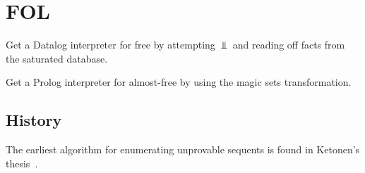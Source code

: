 \chapter{FOL}
\label{chapter-fol}

Get a Datalog interpreter for free by attempting $\Bot$ and reading off facts
from the saturated database.

Get a Prolog interpreter for almost-free by using the magic sets transformation.

\section{History}

The earliest algorithm for enumerating unprovable sequents is found in Ketonen's
thesis~\cite{Ketonen.1944.Thesis}.
